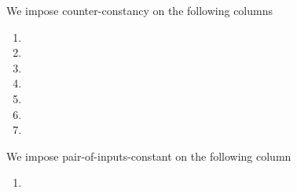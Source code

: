 We impose counter-constancy on the following columns
\begin{multicols}{3}
    \begin{enumerate}
        \item \maxCt{}
        \item \isInfinity{}
        \item \accInputs{}
        \item \trivialAcc{}
        \item \membershipTestRequired{}
        \item \malformedDataExternalBit{}
        \item \malformedDataExternalAcc{}
    \end{enumerate}
\end{multicols}
We impose pair-of-inputs-constant on the following column
\begin{multicols}{3}
    \begin{enumerate}
        \item \pairOfPointsContainsInfinity{}
    \end{enumerate}
\end{multicols}
